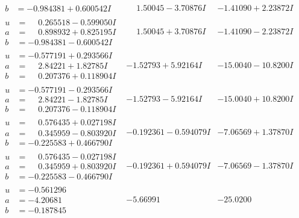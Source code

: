 \documentclass[1p]{elsarticle_modified}
\theoremstyle{definition}
\begin{document}
$$\begin{array}{c|c|c}
\begin{aligned}
b &= -0.984381 + 0.600542 I\end{aligned}
 & \phantom{-}1.50045 - 3.70876 I & -1.41090 + 2.23872 I \\ \hline\begin{aligned}
u &= \phantom{-}0.265518 - 0.599050 I \\
a &= \phantom{-}0.898932 + 0.825195 I \\
b &= -0.984381 - 0.600542 I\end{aligned}
 & \phantom{-}1.50045 + 3.70876 I & -1.41090 - 2.23872 I \\ \hline\begin{aligned}
u &= -0.577191 + 0.293566 I \\
a &= \phantom{-}2.84221 + 1.82785 I \\
b &= \phantom{-}0.207376 + 0.118904 I\end{aligned}
 & -1.52793 + 5.92164 I & -15.0040 - 10.8200 I \\ \hline\begin{aligned}
u &= -0.577191 - 0.293566 I \\
a &= \phantom{-}2.84221 - 1.82785 I \\
b &= \phantom{-}0.207376 - 0.118904 I\end{aligned}
 & -1.52793 - 5.92164 I & -15.0040 + 10.8200 I \\ \hline\begin{aligned}
u &= \phantom{-}0.576435 + 0.027198 I \\
a &= \phantom{-}0.345959 - 0.803920 I \\
b &= -0.225583 + 0.466790 I\end{aligned}
 & -0.192361 - 0.594079 I & -7.06569 + 1.37870 I \\ \hline\begin{aligned}
u &= \phantom{-}0.576435 - 0.027198 I \\
a &= \phantom{-}0.345959 + 0.803920 I \\
b &= -0.225583 - 0.466790 I\end{aligned}
 & -0.192361 + 0.594079 I & -7.06569 - 1.37870 I \\ \hline\begin{aligned}
u &= -0.561296\phantom{ +0.000000I} \\
a &= -4.20681\phantom{ +0.000000I} \\
b &= -0.187845\phantom{ +0.000000I}\end{aligned}
 & -5.66991\phantom{ +0.000000I} & -25.0200\phantom{ +0.000000I} \\ \hline\begin{aligned}

\end{aligned}
\end{array}$$
\end{document}
